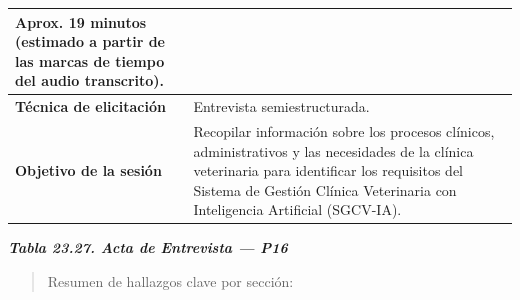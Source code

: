 \documentclass[
]{article}
\begin{document}
{\begin{longtable}[]{|
  >{\raggedright\arraybackslash}p{}|
  >{\raggedright\arraybackslash}p{}|}
\begin{minipage}[t]{\linewidth}
Aprox. 19 minutos (estimado a partir de las marcas de tiempo del audio transcrito).
\end{minipage} \\
\hline
\textbf{Técnica de elicitación} & \begin{minipage}[t]{\linewidth}\raggedright
Entrevista semiestructurada.
\end{minipage} \\
\hline
\textbf{Objetivo de la sesión} & \begin{minipage}[t]{\linewidth}\raggedright
Recopilar información sobre los procesos clínicos, administrativos y las necesidades de la clínica veterinaria para identificar los requisitos del Sistema de Gestión Clínica Veterinaria con Inteligencia Artificial (SGCV-IA).
\end{minipage} \\
\hline
\end{longtable}
}

\protect{}\label{_bookmark_P16_acta}{}\emph{\textbf{Tabla 23.27. Acta de Entrevista --- P16}}

\begin{quote}
Resumen de hallazgos clave por sección:
\end{quote}
\end{document}
